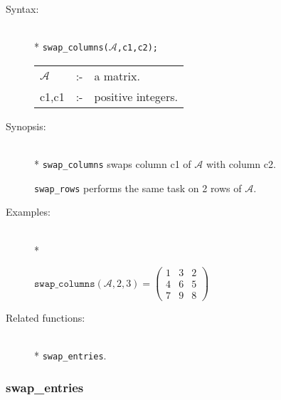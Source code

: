 \begin{description}
\item[Syntax:]\mbox{}\\*
\texttt{swap\_columns($\mathcal{A}$,c1,c2);}\\[2mm]
\begin{tabular}{l l l}
$\mathcal{A}$ &:-& a matrix. \\
c1,c1      &:-& positive integers. 
\end{tabular}

\item[Synopsis:]\mbox{}\\*
\texttt{swap\_columns} swaps column c1 of $\mathcal{A}$ with column c2. 

\texttt{swap\_rows} performs the same task on 2 rows of $\mathcal{A}$.

\item[Examples:]\mbox{}\\*
\begin{flushleft}  
\begin{math}  
\texttt{swap\_columns}(\mathcal{A},2,3) = 
        \begin{pmatrix} 1 & 3 & 2 \\ 4 & 6 & 5 \\ 7 & 9 & 8 \end{pmatrix}
\end{math}  
\end{flushleft}

\item[Related functions:]\mbox{}\\*
\texttt{swap\_entries}.
\end{description}


\subsubsection{swap\_entries}
\label{linalg:swap_entries}

